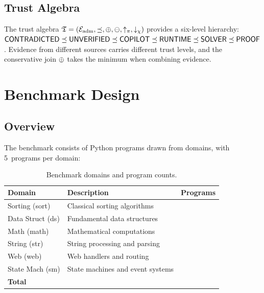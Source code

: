 \documentclass[11pt]{article}
\begin{document}
\subsection{Trust Algebra}

The trust algebra $\mathfrak{T} = (\mathcal{E}_{\mathrm{adm}}, \preceq, \oplus, \ominus,
\uparrow_\pi, \downarrow_\chi)$ provides a six-level hierarchy:
$\mathsf{CONTRADICTED} \preceq \mathsf{UNVERIFIED} \preceq \mathsf{COPILOT} \preceq \mathsf{RUNTIME} \preceq
\mathsf{SOLVER} \preceq \mathsf{PROOF}$.  Evidence from different sources carries
different trust levels, and the conservative join $\oplus$ takes
the minimum when combining evidence.

\section{Benchmark Design}\label{sec:benchmark}

\subsection{Overview}

The benchmark consists of \expTotalPrograms{} Python programs drawn
from \expDomainCount{} domains, with 5~programs per domain:

\begin{table}[H]
\centering
\caption{Benchmark domains and program counts.}\label{tab:domains-overview}
\begin{tabular}{@{}l l r@{}}
\toprule
\textbf{Domain} & \textbf{Description} & \textbf{Programs} \\
\midrule
Sorting (sort)  & Classical sorting algorithms   & \expDomainSortCount{} \\
Data Struct (ds)& Fundamental data structures    & \expDomainDsCount{} \\
Math (math)     & Mathematical computations      & \expDomainMathCount{} \\
String (str)    & String processing and parsing  & \expDomainStrCount{} \\
Web (web)       & Web handlers and routing       & \expDomainWebCount{} \\
State Mach (sm) & State machines and event systems& \expDomainSmCount{} \\
\midrule
\textbf{Total}  &                                & \textbf{\expTotalPrograms{}} \\
\bottomrule
\end{tabular}
\end{table}
\end{document}
